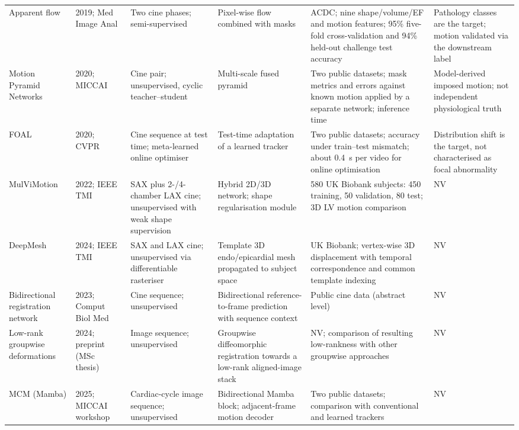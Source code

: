 \documentclass[11pt,a4paper]{article}
\begin{document}
{\begin{longtable}{L{0.11\textwidth}L{0.115\textwidth}L{0.16\textwidth}L{0.185\textwidth}L{0.205\textwidth}L{0.165\textwidth}}
\addlinespace
Apparent flow & 2019; Med Image Anal~\cite{zheng2019apparent} & Two cine phases; semi-supervised & Pixel-wise flow combined with masks & ACDC; nine shape/volume/EF and motion features; 95\% five-fold cross-validation and 94\% held-out challenge test accuracy & Pathology classes are the target; motion validated via the downstream label \\
\addlinespace
Motion Pyramid Networks & 2020; MICCAI~\cite{yu2020mpn} & Cine pair; unsupervised, cyclic teacher--student & Multi-scale fused pyramid & Two public datasets; mask metrics and errors against known motion applied by a separate network; inference time & Model-derived imposed motion; not independent physiological truth \\
\addlinespace
FOAL & 2020; CVPR~\cite{yu2020foal} & Cine sequence at test time; meta-learned online optimiser & Test-time adaptation of a learned tracker & Two public datasets; accuracy under train--test mismatch; about 0.4~s per video for online optimisation & Distribution shift is the target, not characterised as focal abnormality \\
\addlinespace
MulViMotion & 2022; IEEE TMI~\cite{meng2022mulvimotion} & SAX plus 2-/4-chamber LAX cine; unsupervised with weak shape supervision & Hybrid 2D/3D network; shape regularisation module & 580 UK Biobank subjects: 450 training, 50 validation, 80 test; 3D LV motion comparison & NV \\
\addlinespace
DeepMesh & 2024; IEEE TMI~\cite{meng2024deepmesh} & SAX and LAX cine; unsupervised via differentiable rasteriser & Template 3D endo/epicardial mesh propagated to subject space & UK Biobank; vertex-wise 3D displacement with temporal correspondence and common template indexing & NV \\
\addlinespace
Bidirectional registration network & 2023; Comput Biol Med~\cite{lu2023bireg} & Cine sequence; unsupervised & Bidirectional reference-to-frame prediction with sequence context & Public cine data (abstract level) & NV \\
\addlinespace
Low-rank groupwise deformations & 2024; preprint (MSc thesis)~\cite{rendell2024lowrank} & Image sequence; unsupervised & Groupwise diffeomorphic registration towards a low-rank aligned-image stack & NV; comparison of resulting low-rankness with other groupwise approaches & NV \\
\addlinespace
MCM (Mamba) & 2025; MICCAI work\-shop~\cite{yin2025mcm} & Cardiac-cycle image sequence; unsupervised & Bidirectional Mamba block; adjacent-frame motion decoder & Two public datasets; comparison with conventional and learned trackers & NV \\

\end{longtable}}
\end{document}
